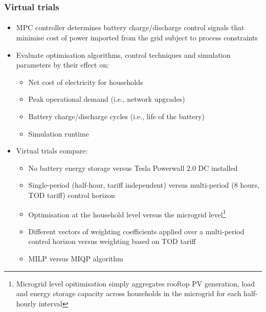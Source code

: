 \documentclass[handout, smaller, xcolor=table]{beamer}			%
\begin{document}
\begin{frame}
	\frametitle{Virtual trials}
	\framesubtitle{}

	\begin{itemize}
		\item  MPC controller determines battery charge/discharge control signals that minimise cost of power imported from the grid subject to process constraints
		
		\item  Evaluate optimisation algorithms, control techniques and simulation parameters by their effect on:
		\begin{itemize}
			\item  Net cost of electricity for households
			\item  Peak operational demand (i.e., network upgrades)
			\item  Battery charge/discharge cycles (i.e., life of the battery)
			\item  Simulation runtime
		\end{itemize}
		
		\item  Virtual trials compare:
		\begin{itemize}
			\item  No battery energy storage versus Tesla Powerwall 2.0 DC installed
			\item  Single-period (half-hour, tariff independent) versus multi-period (8 hours, TOD tariff) control horizon
			\item  Optimisation at the household level versus the microgrid level\footnote{\scriptsize Microgrid level opitimisation simply aggregates rooftop PV generation, load and energy storage capacity across households in the microgrid for each half-hourly interval
			}
			\item  Different vectors of weighting coefficients applied over a multi-period control horizon versus weighting based on TOD tariff
			\item  MILP versus MIQP algorithm
		\end{itemize}
	
	\end{itemize}

\end{frame}
\end{document}
